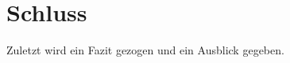 %
\chapter{Schluss}
\label{sec:schluss}

Zuletzt wird ein Fazit gezogen und ein Ausblick gegeben. 


